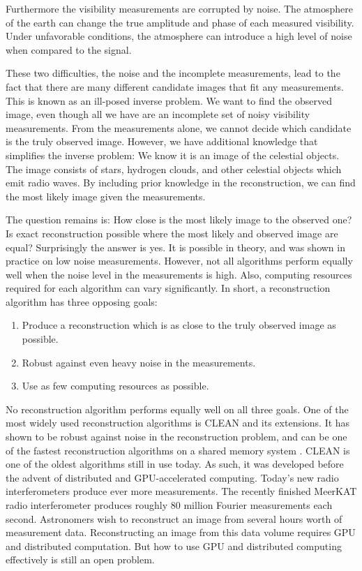 Furthermore the visibility measurements are corrupted by noise. The atmosphere of the earth can change the true amplitude and phase of each measured visibility. Under unfavorable conditions, the atmosphere can introduce a high level of noise when compared to the signal.

These two difficulties, the noise and the incomplete measurements, lead to the fact that there are many different candidate images that fit any measurements.  This is known as an ill-posed inverse problem. We want to find the observed image, even though all we have are an incomplete set of noisy visibility measurements. From the measurements alone, we cannot decide which candidate is the truly observed image. However, we have additional knowledge that simplifies the inverse problem: We know it is an image of the celestial objects. The image consists of stars, hydrogen clouds, and other celestial objects which emit radio waves. By including prior knowledge in the reconstruction, we can find the most likely image given the measurements. 

The question remains is: How close is the most likely image to the observed one? Is exact reconstruction possible where the most likely and observed image are equal? Surprisingly the answer is yes. It is possible in theory\cite{candes2006robust,donoho2006compressed}, and was shown in practice on low noise measurements\cite{dabbech2018cygnus, dabbech2015moresane}. However, not all algorithms perform equally well when the noise level in the measurements is high. Also, computing resources required for each algorithm can vary significantly. In short, a reconstruction algorithm has three opposing goals:
\begin{enumerate}
	\item Produce a reconstruction which is as close to the truly observed image as possible.
	\item Robust against even heavy noise in the measurements.
	\item Use as few computing resources as possible.
\end{enumerate}

No reconstruction algorithm performs equally well on all three goals. One of the most widely used reconstruction algorithms is CLEAN \cite{hogbom1974aperture, rau2011multi} and its extensions. It has shown to be robust against noise in the reconstruction problem, and can be one of the fastest reconstruction algorithms on a shared memory system \cite{offringa2017optimized}. CLEAN is one of the oldest algorithms still in use today. As such, it was developed before the advent of distributed and GPU-accelerated computing. Today's new radio interferometers produce ever more measurements. The recently finished MeerKAT radio interferometer produces roughly 80 million Fourier measurements each second. Astronomers wish to reconstruct an image from several hours worth of measurement data. Reconstructing an image from this data volume requires GPU and distributed computation. But how to use GPU and distributed computing effectively is still an open problem.

